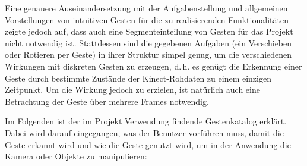 	Eine genauere Auseinandersetzung mit der Aufgabenstellung und allgemeinen Vorstellungen von intuitiven Gesten für die zu realisierenden Funktionalitäten zeigte jedoch auf, dass auch eine Segmenteinteilung von Gesten für das Projekt nicht notwendig ist. Stattdessen sind die gegebenen Aufgaben (ein Verschieben oder Rotieren per Geste) in ihrer Struktur simpel genug, um die verschiedenen Wirkungen mit diskreten Gesten zu erzeugen, d.\,h. es genügt die Erkennung einer Geste durch bestimmte Zustände der Kinect-Rohdaten zu einem einzigen Zeitpunkt. Um die Wirkung jedoch zu erzielen, ist natürlich auch eine Betrachtung der Geste über mehrere Frames notwendig.\par\medskip
	Im Folgenden ist der im Projekt Verwendung findende Gestenkatalog erklärt. Dabei wird darauf eingegangen, was der Benutzer vorführen muss, damit die Geste erkannt wird und wie die Geste genutzt wird, um in der Anwendung die Kamera oder Objekte zu manipulieren:\par\bigskip
